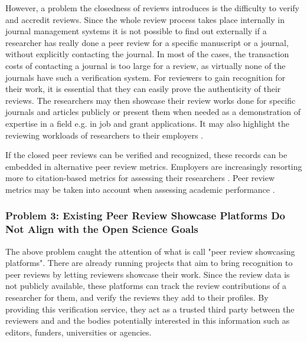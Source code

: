 However, a problem the closedness of reviews introduces is the difficulty to verify and accredit reviews. Since the whole review process takes place internally in journal management systems it is not possible to find out externally if a researcher has really done a peer review for a specific manuscript or a journal, without explicitly contacting the journal. In most of the cases, the transaction costs of contacting a journal is too large for a review, as virtually none of the journals have such a verification system. For reviewers to gain recognition for their work, it is essential that they can easily prove the authenticity of their reviews. The researchers may then showcase their review works done for specific journals and articles publicly or present them when needed as a demonstration of expertise in a field e.g. in job and grant applications. It may also highlight the reviewing workloads of researchers to their employers \parencite[2]{Raoult.2020}. 

If the closed peer reviews can be verified and recognized, these records can be embedded in alternative peer review metrics. Employers are increasingly resorting more to citation-based metrics for assessing their researchers \parencite{Bianchi.2019, Cantor.2015, Kachewar.2013, Verissimo.2013}. Peer review metrics may be taken into account when assessing academic performance \parencite[11]{Ferreira.2016}.

\subsubsection{Problem 3: Existing Peer Review Showcase Platforms Do Not Align with the Open Science Goals}

The above problem caught the attention of what is call "peer review showcasing platforms". There are already running projects that aim to bring recognition to peer reviews by letting reviewers showcase their work. Since the review data is not publicly available, these platforms can track the review contributions of a researcher for them, and verify the reviews they add to their profiles. By providing this verification service, they act as a trusted third party between the reviewers and  and the bodies potentially interested in this information such as editors, funders, universities or agencies.

